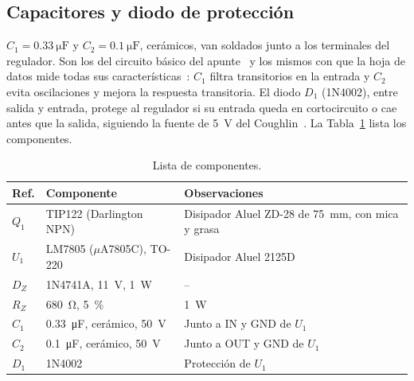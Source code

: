 \subsection{Capacitores y diodo de protección}
$C_1 = \SI{0,33}{\micro\farad}$ y $C_2 = \SI{0,1}{\micro\farad}$, cerámicos, van soldados junto a los terminales del regulador. Son los del circuito básico del apunte~\cite[Fig.~6-62]{ap3} y los mismos con que la hoja de datos mide todas sus características~\cite{ua78}: $C_1$ filtra transitorios en la entrada y $C_2$ evita oscilaciones y mejora la respuesta transitoria. El diodo $D_1$ (1N4002), entre salida y entrada, protege al regulador si su entrada queda en cortocircuito o cae antes que la salida, siguiendo la fuente de \SI{5}{\volt} del Coughlin~\cite[Fig.~15-11]{coughlin}. La Tabla~\ref{tab:componentes} lista los componentes.

\begin{table}[!htb]
\centering
\caption{Lista de componentes.}
\label{tab:componentes}
\footnotesize
\begin{tabular}{@{}l>{\raggedright}p{3.3cm}>{\raggedright\arraybackslash}p{3.4cm}@{}}
\toprule
\textbf{Ref.} & \textbf{Componente} & \textbf{Observaciones} \\
\midrule
$Q_1$ & TIP122 (Darlington NPN) & Disipador Aluel ZD-28 de \SI{75}{\milli\meter}, con mica y grasa \\
$U_1$ & LM7805 ($\mu$A7805C), TO-220 & Disipador Aluel 2125D \\
$D_Z$ & 1N4741A, \SI{11}{\volt}, \SI{1}{\watt} & -- \\
$R_Z$ & \SI{680}{\ohm}, \SI{5}{\percent} & \SI{1}{\watt} \\
$C_1$ & \SI{0,33}{\micro\farad}, cerámico, \SI{50}{\volt} & Junto a IN y GND de $U_1$ \\
$C_2$ & \SI{0,1}{\micro\farad}, cerámico, \SI{50}{\volt} & Junto a OUT y GND de $U_1$ \\
$D_1$ & 1N4002 & Protección de $U_1$ \\
\bottomrule
\end{tabular}
\end{table}
